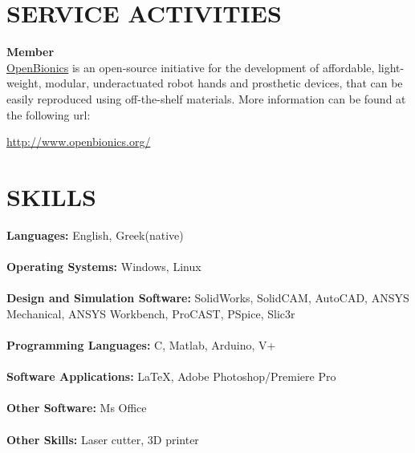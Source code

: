 \documentclass[11pt]{res} %
\begin{document}
\begin{resume}
\section{SERVICE ACTIVITIES} 

\vspace{8pt} %

\small\textbf{Member}\\
\underline{OpenBionics} is an open-source initiative for the development of affordable, light-weight, modular, underactuated
robot hands and prosthetic devices, that can be easily reproduced using off-the-shelf materials. More information can be found at the following url:\begin {center}\url{http://www.openbionics.org/}
\end {center}


\vspace{0.1in} %




\section{SKILLS} 

\vspace{8pt} %

\small \textbf  {Languages:} English, Greek(native) \\\\
\small \textbf  {Operating Systems:} Windows, Linux \\\\
\small \textbf {Design and Simulation Software:}
SolidWorks, SolidCAM, AutoCAD, ANSYS Mechanical, ANSYS Workbench, ProCAST, PSpice, Slic3r\\\\
\small \textbf {Programming Languages:} C, Matlab, Arduino, V+ \\\\
\small \textbf {Software Applications:} \LaTeX, Adobe Photoshop/Premiere Pro\\\\
\small \textbf {Other Software:} Ms Office\\\\
\small \textbf {Other Skills:} Laser cutter, 3D printer


\end{resume}
\end{document}
